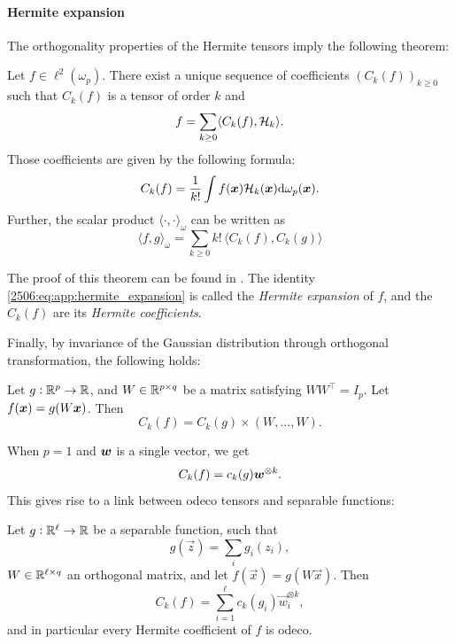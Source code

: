\paragraph{Hermite expansion} The orthogonality properties of the Hermite tensors imply the following theorem:
\begin{theorem}
    Let $f \in \ell^2(\omega_p)$. There exist a unique sequence of coefficients $\left(C_k(f)\right)_{k \geq 0}$ such that $C_k(f)$ is a tensor of order $k$ and
    \begin{equation}\label{2506:eq:app:hermite_expansion}
        f = \sum_{k \geq 0} \langle C_k(f), \mathcal{H}_k \rangle.
    \end{equation} 
    Those coefficients are given by the following formula:
    \[ C_k(f) = \frac1{k!}\int f({\boldsymbol{x}}) \mathcal{H}_k({\boldsymbol{x}}) \text{d}\omega_p({\boldsymbol{x}}). \]
    Further, the scalar product $\langle \cdot, \cdot \rangle_\omega$ can be written as 
    \[ \langle f, g \rangle_\omega = \sum_{k \geq 0} k!\,\langle C_k(f), C_k(g) \rangle \]
\end{theorem}
The proof of this theorem can be found in \cite{grad1949note}. The identity \eqref{2506:eq:app:hermite_expansion} is called the \emph{Hermite expansion} of $f$, and the $C_k(f)$ are its \emph{Hermite coefficients}. 

Finally, by invariance of the Gaussian distribution through orthogonal transformation, the following holds:
\begin{lemma}
    Let $g: \mathbb{R}^p \to \mathbb{R}$, and $W \in \mathbb{R}^{p \times q}$ be a matrix satisfying $WW^\top = I_p$. Let $f({\boldsymbol{x}}) = g(W{\boldsymbol{x}})$. Then
    \[ C_k(f) = C_k(g) \times (W, \dots, W). \]
\end{lemma}
When $p = 1$ and ${\boldsymbol{w}}$ is a single vector, we get
\[ C_k(f) = c_k(g) {\boldsymbol{w}}^{\otimes k}. \]
This gives rise to a link between odeco tensors and separable functions:
\begin{lemma}
    Let $g: \mathbb{R}^\ell \to \mathbb{R}$ be a separable function, such that
    \[g(\vec{z}) = \sum_{i} g_i(z_i),\]
    $W \in \mathbb{R}^{\ell \times q}$ an orthogonal matrix, and let $f(\vec{x}) = g(W\vec{x}).$ Then
    \[ C_k(f) = \sum_{i=1}^\ell c_k(g_i) \vec{w}_i^{\otimes k}, \]
    and in particular every Hermite coefficient of $f$ is odeco.
\end{lemma}
